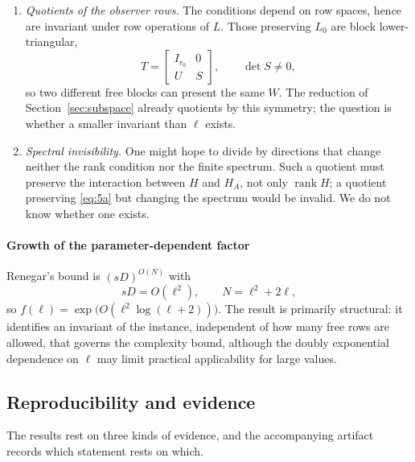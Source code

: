 \documentclass[journal]{IEEEtran}
\theoremstyle{plainn}
\theoremstyle{remark}
\begin{document}
\begin{enumerate}
\item \emph{Quotients of the observer rows.} The conditions depend on row spaces, hence are
invariant under row operations of $L$. Those preserving $L_0$ are block lower-triangular,
\begin{equation*}
T=\begin{bmatrix}I_{r_0}&0\\ U&S\end{bmatrix},\qquad \det S\ne0 ,
\end{equation*}
so two different free blocks can present the same $W$. The reduction of
Section~\ref{sec:subspace} already quotients by this symmetry; the question is whether a
smaller invariant than $\ell$ exists.
\item \emph{Spectral invisibility.} One might hope to divide by directions that change neither
the rank condition nor the finite spectrum. Such a quotient must preserve the interaction
between $H$ and $H_A$, not only $\operatorname{rank}H$; a quotient preserving \eqref{eq:5a} but
changing the spectrum would be invalid. We do not know whether one exists.
\end{enumerate}

\paragraph*{Growth of the parameter-dependent factor}
Renegar's bound is $(sD)^{O(N)}$ with
\begin{equation*}
sD=O(\ell^2),\qquad N=\ell^2+2\ell ,
\end{equation*}
so $f(\ell)=\exp\bigl(O(\ell^2\log(\ell+2))\bigr)$. The result is primarily structural: it
identifies an invariant of the instance, independent of how many free rows are allowed, that
governs the complexity bound, although the doubly exponential dependence on $\ell$ may limit
practical applicability for large values.

\subsection{Reproducibility and evidence}\label{sec:repro}

The results rest on three kinds of evidence, and the accompanying artifact records which statement rests on which.
\end{document}
